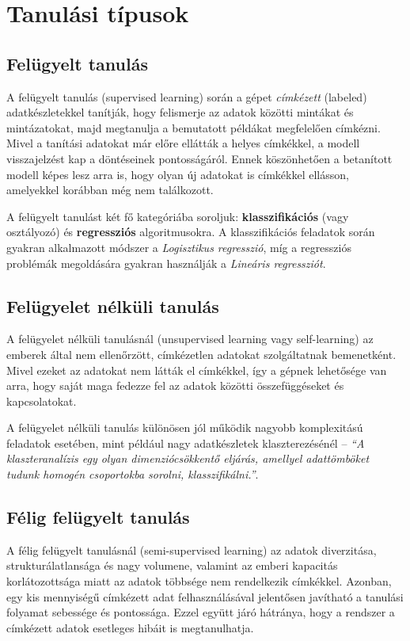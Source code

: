 \documentclass[
]{thesis-ekf}
\theoremstyle{definition}
\theoremstyle{remark}
\begin{document}
\section{Tanulási típusok}
\subsection{Felügyelt tanulás}
A felügyelt tanulás (supervised learning) során a gépet \emph{címkézett} (labeled) adatkészletekkel tanítják, hogy felismerje az adatok közötti mintákat és mintázatokat, majd megtanulja a bemutatott példákat megfelelően címkézni. Mivel a tanítási adatokat már előre ellátták a helyes címkékkel, a modell visszajelzést kap a döntéseinek pontosságáról. Ennek köszönhetően a betanított modell képes lesz arra is, hogy olyan új adatokat is címkékkel ellásson, amelyekkel korábban még nem találkozott.\cite{supervised-learning-google, gepi-tanulas-3-fo-tipusa}

A felügyelt tanulást két fő kategóriába soroljuk: \textbf{klasszifikációs} (vagy osztályozó) és \textbf{regressziós} algoritmusokra. A klasszifikációs feladatok során gyakran alkalmazott módszer a \emph{Logisztikus regresszió}, míg a regressziós problémák megoldására gyakran használják a \emph{Lineáris regressziót}.\cite{wiki-ml, supervised-learning-google}

\subsection{Felügyelet nélküli tanulás}
\label{subsec-unsupervised-learning}
A felügyelet nélküli tanulásnál (unsupervised learning vagy self-learning) az emberek által nem ellenőrzött, címkézetlen adatokat szolgáltatnak bemenetként. Mivel ezeket az adatokat nem látták el címkékkel, így a gépnek lehetősége van arra, hogy saját maga fedezze fel az adatok közötti összefüggéseket és kapcsolatokat.\cite{unsupervised-learning-google}

A felügyelet nélküli tanulás különösen jól működik nagyobb komplexitású feladatok esetében, mint például nagy adatkészletek klaszterezésénél -- \emph{``A klaszteranalízis egy olyan dimenziócsökkentő eljárás, amellyel adattömböket tudunk homogén csoportokba sorolni, klasszifikálni.''}\cite{wiki-klaszteranalízis}.

\subsection{Félig felügyelt tanulás}
A félig felügyelt tanulásnál (semi-supervised learning) az adatok diverzitása, strukturálatlansága és nagy volumene, valamint az emberi kapacitás korlátozottsága miatt az adatok többsége nem rendelkezik címkékkel. Azonban, egy kis mennyiségű címkézett adat felhasználásával jelentősen javítható a tanulási folyamat sebessége és pontossága. Ezzel együtt járó hátránya, hogy a rendszer a címkézett adatok esetleges hibáit is megtanulhatja.\cite{semi-supervised-learning-mit,mi-a-gepi-tanulas}
\end{document}
